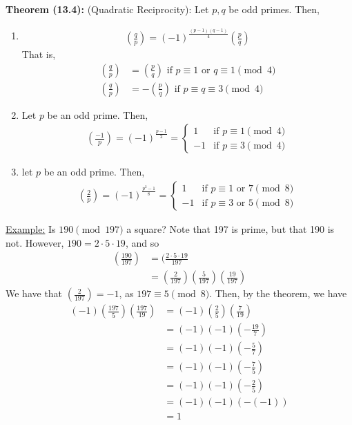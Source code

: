 \documentclass{article}
\begin{document}
\textbf{Theorem (13.4):} (Quadratic Reciprocity): Let $p,q$ be odd primes. Then, \begin{enumerate}
    \item \begin{align*}
        (\frac{q}{p})=(-1)^{\frac{(p-1)(q-1)}{4}}(\frac{p}{q})
    \end{align*}That is, \begin{align*}
        (\frac{q}{p})&=(\frac{p}{q})\text{ if }p\equiv 1\text{ or }q\equiv 1\pmod 4\\
        (\frac{q}{p})&=-(\frac{p}{q})\text{ if }p\equiv q\equiv 3\pmod 4
    \end{align*}
    \item Let $p$ be an odd prime. Then, \begin{align*}
        (\frac{-1}{p})=(-1)^{\frac{p-1}{2}}=\begin{cases}
            1 & \text{if }p\equiv 1\pmod 4\\
            -1 & \text{if }p\equiv 3\pmod 4
        \end{cases}
    \end{align*}
    \item let $p$ be an odd prime. Then, \begin{align*}
        (\frac{2}{p})=(-1)^{\frac{p^2-1}{8}}=\begin{cases}
            1 & \text{if }p\equiv 1\text{ or }7\pmod 8\\
            -1 & \text{if }p\equiv 3\text{ or }5\pmod 8
        \end{cases}
    \end{align*}
\end{enumerate}
 
 \underline{Example:} Is $190\pmod{197}$ a square? Note that 197 is prime, but that 190 is not. However, $190=2\cdot 5\cdot 19$, and so \begin{align*}
	(\frac{190}{197})&=(\frac{2\cdot 5\cdot 19}{197}\\
	&=(\frac{2}{197})(\frac{5}{197})(\frac{19}{197})
\end{align*}
We have that $(\frac{2}{197})=-1$, as $197\equiv 5\pmod 8$. Then, by the theorem, we have \begin{align*}
	(-1)(\frac{197}{5})(\frac{197}{19})&=(-1)(\frac{2}{5})(\frac{7}{19})\\
	&=(-1)(-1)(-\frac{19}{7})\\
    &=(-1)(-1)(-\frac{5}{7})\\
    &=(-1)(-1)(-\frac{7}{5})\\
    &=(-1)(-1)(-\frac{2}{5})\\
    &=(-1)(-1)(-(-1))\\
    &=1
\end{align*}
\end{document}
